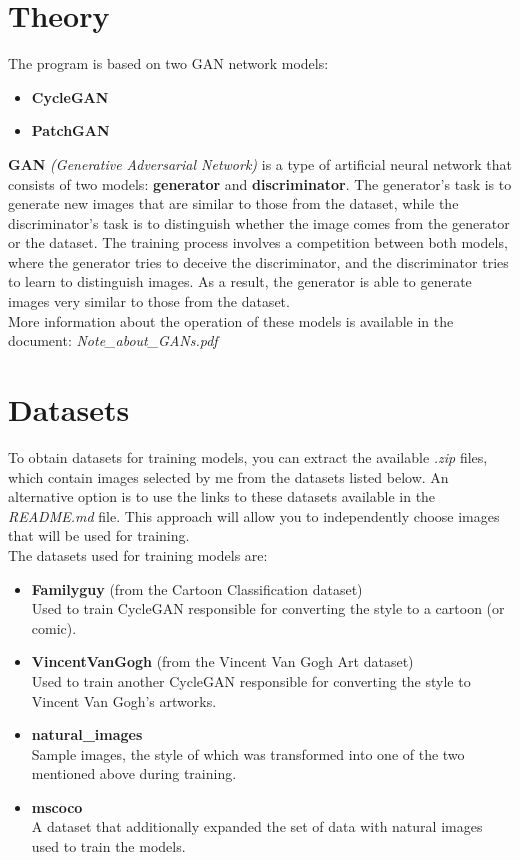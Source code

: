 \documentclass{article}
\begin{document}
\section{Theory}
The program is based on two GAN network models:
\begin{itemize}
    \setlength\itemsep{0pt}
    \item \textbf{CycleGAN}
    \item \textbf{PatchGAN}
\end{itemize}
\textbf{GAN} \textit{(Generative Adversarial Network)} is a type of artificial neural network that consists of two models: \textbf{generator} and \textbf{discriminator}.
The generator's task is to generate new images that are similar to those from the dataset, while the discriminator's task is to distinguish whether the image comes from the generator or the dataset.
The training process involves a competition between both models, where the generator tries to deceive the discriminator, and the discriminator tries to learn to distinguish images.
As a result, the generator is able to generate images very similar to those from the dataset.
\vspace{3mm} \\
More information about the operation of these models is available in the document: \textit{Note\_about\_GANs.pdf}

\section{Datasets}
To obtain datasets for training models, you can extract the available \textit{.zip} files, which contain images selected by me from the datasets listed below. An alternative option is to use the links to these datasets available in the \textit{README.md} file. This approach will allow you to independently choose images that will be used for training.
\vspace{3mm} \\
The datasets used for training models are:
\begin{itemize}
    \item \textbf{Familyguy} (from the Cartoon Classification dataset) \\
Used to train CycleGAN responsible for converting the style to a cartoon (or comic).
    \item \textbf{VincentVanGogh} (from the Vincent Van Gogh Art dataset) \\
Used to train another CycleGAN responsible for converting the style to Vincent Van Gogh's artworks.
    \item \textbf{natural\_images} \\
Sample images, the style of which was transformed into one of the two mentioned above during training.
    \item \textbf{mscoco} \\
A dataset that additionally expanded the set of data with natural images used to train the models.
\end{itemize}
\end{document}
